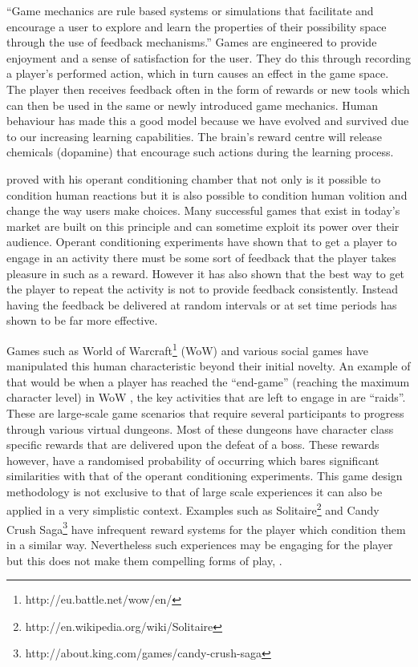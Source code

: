 \documentclass[final]{cmpreport}
\begin{document}
``Game mechanics are rule based systems or simulations that facilitate and encourage a user to explore and learn the properties of their possibility space through the use of feedback mechanisms.''\cite{Koster} Games are engineered to provide enjoyment and a sense of satisfaction for the user. They do this through recording a player's performed action, which in turn causes an effect in the game space. The player then receives feedback often in the form of rewards or new tools which can then be used in the same or newly introduced game mechanics. Human behaviour has made this a good model because we have evolved and survived due to our increasing learning capabilities. The brain's reward centre will release chemicals (dopamine) that encourage such actions during the learning process.

\cite{Skinner} proved with his operant conditioning chamber that not only is it possible to condition human reactions but it is also possible to condition human volition and change the way users make choices. Many successful games that exist in today's market are built on this principle and can sometime exploit its power over their audience. Operant conditioning experiments have shown that to get a player to engage in an activity there must be some sort of feedback that the player takes pleasure in such as a reward. However it has also shown that the best way to get the player to repeat the activity is not to provide feedback consistently. Instead having the feedback be delivered at random intervals or at set time periods has shown to be far more effective.

Games such as World of Warcraft\footnote{http://eu.battle.net/wow/en/} (WoW) and various social games have manipulated this human characteristic beyond their initial novelty. An example of that would be when a player has reached the ``end-game'' (reaching the maximum character level) in WoW , the key activities that are left to engage in are ``raids''. These are large-scale game scenarios that require several participants to progress through various virtual dungeons. Most of these dungeons have character class specific rewards that are delivered upon the defeat of a boss. These rewards however, have a randomised probability of occurring which bares significant similarities with that of the operant conditioning experiments. This game design methodology is not exclusive to that of large scale experiences it can also be applied in a very simplistic context. Examples such as Solitaire\footnote{http://en.wikipedia.org/wiki/Solitaire} and Candy Crush Saga\footnote{http://about.king.com/games/candy-crush-saga} have infrequent reward systems for the player which condition them in a similar way. Nevertheless such experiences may be engaging for the player but this does not make them compelling forms of play, \cite{ExtraCredits}.
\end{document}
